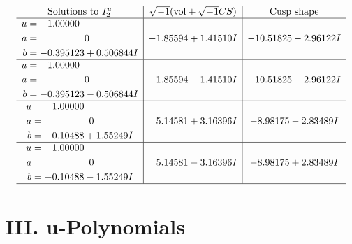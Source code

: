 \documentclass[1p]{elsarticle_modified}
\theoremstyle{definition}
\newcommand{\I}{\sqrt{-1}}
\begin{document}
$$\begin{array}{c|c|c}  
\text{Solutions to }I^u_{2}& \I (\text{vol} + \sqrt{-1}CS) & \text{Cusp shape}\\
 \hline 
\begin{aligned}
u &= \phantom{-}1.00000\phantom{ +0.000000I} \\
a &= \phantom{-0.000000 } 0 \\
b &= -0.395123 + 0.506844 I\end{aligned}
 & -1.85594 + 1.41510 I & -10.51825 - 2.96122 I \\ \hline\begin{aligned}
u &= \phantom{-}1.00000\phantom{ +0.000000I} \\
a &= \phantom{-0.000000 } 0 \\
b &= -0.395123 - 0.506844 I\end{aligned}
 & -1.85594 - 1.41510 I & -10.51825 + 2.96122 I \\ \hline\begin{aligned}
u &= \phantom{-}1.00000\phantom{ +0.000000I} \\
a &= \phantom{-0.000000 } 0 \\
b &= -0.10488 + 1.55249 I\end{aligned}
 & \phantom{-}5.14581 + 3.16396 I & -8.98175 - 2.83489 I \\ \hline\begin{aligned}
u &= \phantom{-}1.00000\phantom{ +0.000000I} \\
a &= \phantom{-0.000000 } 0 \\
b &= -0.10488 - 1.55249 I\end{aligned}
 & \phantom{-}5.14581 - 3.16396 I & -8.98175 + 2.83489 I\\
 \hline 
 \end{array}$$\newpage
\newpage\renewcommand{\arraystretch}{1}
\centering \section*{ III. u-Polynomials}
\end{document}
